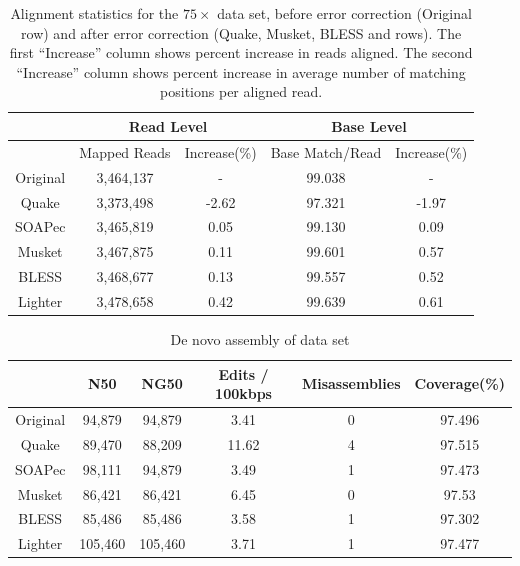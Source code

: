 \documentclass{bmcart}
\begin{document}
\begin{backmatter}
\begin{table}[h!] %
\caption{Alignment statistics for the $75\times$ \ecoli data set, before error correction (Original row) and after error correction (Quake, Musket, BLESS and \tool rows).  The first ``Increase'' column shows percent increase in reads aligned.  The second ``Increase'' column shows percent increase in average number of matching positions per aligned read.}
\begin{tabular}{|c|c|c||c|c|} \hline
	 & \multicolumn{2}{|c||}{Read Level} & \multicolumn{2}{|c|}{Base Level} \\ \hline
     & Mapped Reads & Increase(\%) & Base Match/Read & Increase(\%) \\ \hline
Original & 	3,464,137	 & - & 99.038	& - \\ \hline
Quake	& 3,373,498	& -2.62	& 97.321	& -1.97  \\ \hline
SOAPec  & 3,465,819 & 0.05 &  99.130 & 0.09 \\ \hline
Musket	& 3,467,875	& 0.11	& 99.601	& 0.57  \\ \hline
BLESS	& 3,468,677& 0.13	& 99.557	& 0.52  \\ \hline
Lighter	&  3,478,658	& 0.42	& 99.639	& 0.61  \\ \hline
\end{tabular}
\end{table}

\begin{table}[h!] %
\caption{De novo assembly of \ecoli data set}
\begin{tabular}{|c|c|c|c|c|c|} \hline
	 	& N50 &	NG50	 & Edits / 100kbps&	Misassemblies	& Coverage(\%) \\ \hline
Original &	94,879 &	94,879	& 3.41	& 0	& 97.496  \\ \hline
Quake	& 89,470 &	88,209	& 11.62	& 4	 & 97.515  \\ \hline
SOAPec	& 98,111 &	94,879	& 3.49	& 1	& 97.473	\\ \hline
Musket	& 86,421  &	86,421	& 6.45	& 0	 & 97.53 \\ \hline
BLESS	& 85,486  &	85,486	& 3.58	& 1	& 97.302  \\ \hline
Lighter	& 105,460 &	105,460	& 3.71	& 1	& 97.477  \\ \hline

\end{tabular}
\end{table}



\end{backmatter}
\end{document}
